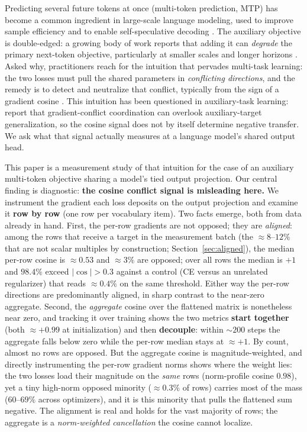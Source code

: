 \documentclass{article}
\begin{document}
Predicting several future tokens at once (multi-token prediction, MTP) has
become a common ingredient in large-scale language modeling, used to improve
sample efficiency and to enable self-speculative decoding
\citep{gloeckle2024mtp,deepseekv3}. The auxiliary objective is double-edged: a
growing body of work reports that adding it can \emph{degrade} the primary
next-token objective, particularly at smaller scales and longer horizons
\citep{gloeckle2024mtp,zuhri2025top}. Asked why, practitioners reach for the
intuition that pervades multi-task learning: the two losses must pull the shared
parameters in \emph{conflicting directions}, and the remedy is to detect and
neutralize that conflict, typically from the sign of a gradient cosine
\citep{yu2020pcgrad,wang2021gradvaccine}. This intuition has been questioned in
auxiliary-task learning: \citet{jiang2023forkmerge} report that gradient-conflict
coordination can overlook auxiliary-target generalization, so the cosine signal
does not by itself determine negative transfer. We ask what that signal actually
measures at a language model's shared output head.

This paper is a measurement study of that intuition for the case of an auxiliary
multi-token objective sharing a model's tied output projection. Our central
finding is diagnostic: \textbf{the cosine conflict signal is misleading here.} We
instrument the gradient each loss deposits on the output projection and examine
it \textbf{row by row} (one row per vocabulary item). Two facts emerge, both from
data already in hand. First, the per-row gradients are not opposed; they are
\emph{aligned}: among the rows that receive a target in the measurement batch
(the ${\approx}8$--$12\%$ that are not scalar multiples by construction;
Section~\ref{sec:aligned}), the median per-row cosine is ${\approx}0.53$ and
${\approx}3\%$ are opposed; over all rows the median is $+1$ and $98.4\%$ exceed
$|\cos|>0.3$ against a control (CE versus an unrelated regularizer) that reads
${\approx}0.4\%$ on the same threshold. Either way the per-row directions are
predominantly aligned, in sharp contrast to the near-zero aggregate. Second,
the \emph{aggregate} cosine over the flattened matrix is nonetheless near zero,
and tracking it over training shows the two metrics \textbf{start together} (both
$\approx +0.99$ at initialization) and then \textbf{decouple}: within ${\sim}200$
steps the aggregate falls below zero while the per-row median stays at
$\approx +1$. By count, almost no rows are opposed. But the aggregate cosine is
magnitude-weighted, and directly instrumenting the per-row gradient norms shows
where the weight lies: the two losses load their magnitude on the \emph{same}
rows (norm-profile cosine $0.98$), yet a tiny high-norm opposed minority
($\approx 0.3\%$ of rows) carries most of the mass ($60$--$69\%$ across
optimizers), and it is this minority that pulls the flattened sum negative. The
alignment is real and holds for the vast majority of rows; the aggregate is a
\emph{norm-weighted cancellation} the cosine cannot localize.
\end{document}
